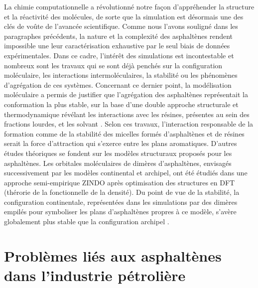 	La chimie computationnelle a révolutionné notre façon d'appréhender la structure et la réactivité des molécules, de sorte que la simulation est désormais une des clés de voûte de l'avancée scientifique. 
	Comme nous l'avons souligné dans les paragraphes précédents, la nature et la complexité des asphaltènes rendent impossible une leur caractérisation exhaustive par le seul biais de données expérimentales. Dans ce cadre, l'intérêt des simulations est incontestable et nombreux sont les travaux qui se sont déjà penchés sur la configuration moléculaire, les interactions intermoléculaires, la stabilité ou les phénomènes d'agrégation de ces systèmes.  
	Concernant ce dernier point, la modélisation moléculaire a permis de justifier que l'agrégation des asphaltènes représentait la conformation la plus stable, sur la base d'une double approche structurale et thermodynamique révélant les interactions avec les résines, présentes au sein des fractions lourdes, et les solvant \cite{murgich1996molecular}. Selon ces travaux, l'interaction responsable de la formation comme de la stabilité des micelles formés d'asphaltènes et de résines serait la force d'attraction qui s'exerce entre les plans aromatiques. 
	D'autres études théoriques se fondent sur les modèles structuraux proposés pour les asphaltènes. Les orbitales moléculaires de dimères d'asphaltènes, envisagés successivement par les modèles continental et archipel, ont été étudiés dans une approche semi-empirique ZINDO après optimisation des structures en DFT (thérorie de la fonctionnelle de la densité). Du point de vue de la stabilité, la configuration continentale, représentées dans les simulations par des dimères empilés pour symboliser les plans d'asphaltènes propres à ce modèle, s'avère globalement plus stable que la configuration archipel \cite{alvarez2013island}. 
	
	
	\bigskip
	\singlespacing
	\section{Problèmes liés aux asphaltènes dans l'industrie pétrolière}
	
